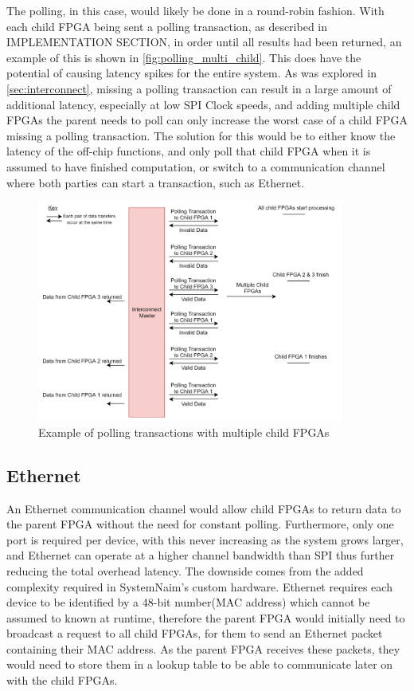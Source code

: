 The polling, in this case, would likely be done in a round-robin fashion. With each child FPGA being sent a polling transaction, as described in IMPLEMENTATION SECTION, in order until all results had been returned, an example of this is shown in  \autoref{fig:polling_multi_child}. This does have the potential of causing latency spikes for the entire system. As was explored in \autoref{sec:interconnect}, missing a polling transaction can result in a large amount of additional latency, especially at low SPI Clock speeds, and adding multiple child FPGAs the parent needs to poll can only increase the worst case of a child FPGA missing a polling transaction. The solution for this would be to either know the latency of the off-chip functions, and only poll that child FPGA when it is assumed to have finished computation, or switch to a communication channel where both parties can start a transaction, such as Ethernet.

\begin{figure}[!h]
    \centering
    \includegraphics[width=0.9\textwidth]{06_future_work/images/interconnect_polling_multi_child.png}
    \caption{Example of polling transactions with multiple child FPGAs}
    \label{fig:polling_multi_child}
\end{figure}

\subsection{Ethernet}

An Ethernet communication channel would allow child FPGAs to return data to the parent FPGA without the need for constant polling. Furthermore, only one port is required per device, with this never increasing as the system grows larger, and Ethernet can operate at a higher channel bandwidth than SPI thus further reducing the total overhead latency. The downside comes from the added complexity required in SystemNaim's custom hardware. Ethernet requires each device to be identified by a 48-bit number(MAC address) which cannot be assumed to known at runtime, therefore the parent FPGA would initially need to broadcast a request to all child FPGAs, for them to send an Ethernet packet containing their MAC address. As the parent FPGA receives these packets, they would need to store them in a lookup table to be able to communicate later on with the child FPGAs.

